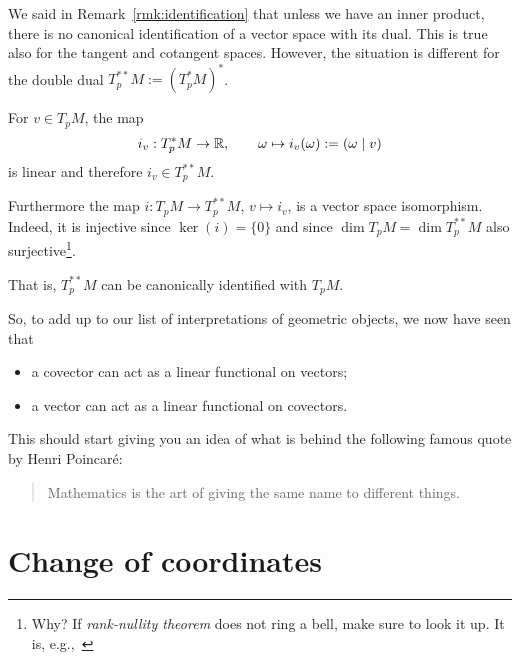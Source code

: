 \begin{remark}
  We said in Remark~\ref{rmk:identification} that unless we have an inner product, there is no canonical identification of a vector space with its dual.
  This is true also for the tangent and cotangent spaces.
  However, the situation is different for the double dual $T^{**}_pM := (T^*_pM)^*$.

  For $v\in T_p M$, the map
  \begin{equation}
    i_v: T_p^*M\to \mathbb{R}, \qquad
    \omega \mapsto i_v(\omega) := (\omega\mid v)
  \end{equation}
  is linear and therefore $i_v\in T^{**}_pM$.

  Furthermore the map $i : T_pM \to T_p^{**}M$, $v\mapsto i_v$, is a vector space isomorphism. Indeed, it is injective since $\ker(i) = \{0\}$ and since $\dim T_p M = \dim T^{**}_p M$ also surjective\footnote{Why? If \emph{rank-nullity theorem} does not ring a bell, make sure to look it up. It is, e.g.,~\cite[Corollary B.21]{book:lee}}.

  That is, $T^{**}_pM$ can be canonically identified with $T_p M$.

  So, to add up to our list of interpretations of geometric objects, we now have seen that
  \begin{itemize}
    \item a covector can act as a linear functional on vectors;
    \item a vector can act as a linear functional on covectors.
  \end{itemize}
\end{remark}

This should start giving you an idea of what is behind the following famous quote by Henri Poincar\'e:
\begin{quote}
  Mathematics is the art of giving the same name to different things.
\end{quote}

\section{Change of coordinates}

